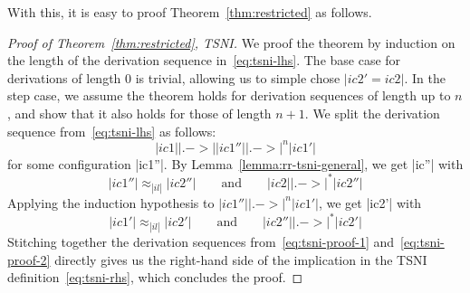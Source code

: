 With this, it is easy to proof Theorem~\ref{thm:restricted} as follows.
\begin{proof}[Proof of Theorem~\ref{thm:restricted}, TSNI]
  We proof the theorem by induction on the length of the derivation sequence in~\eqref{eq:tsni-lhs}.
  The base case for derivations
  of length 0 is trivial, allowing
  us to simple chose $|ic2'=ic2|$.  In the step case, we assume
  the theorem holds for derivation sequences of length up to $n$, and show that it also
  holds for those of length $n+1$.  We split the derivation sequence from~\eqref{eq:tsni-lhs} as follows:
  \[
  |ic1| |.->| |ic1''| |.->|^n |ic1'|
  \]
  for some configuration |ic1''|.  By Lemma~\ref{lemma:rr-tsni-general}, we get
  |ic''| with
  \begin{equation} \label{eq:tsni-proof-1}
  |ic1''| \approx_{|il|} |ic2''|
  \qquad \text{and} \qquad
  |ic2| |.->|^* |ic2''|
  \end{equation}
  Applying the induction hypothesis to
  $|ic1''| |.->|^n |ic1'|$, we get |ic2'| with
  \begin{equation} \label{eq:tsni-proof-2}
  |ic1'| \approx_{|il|} |ic2'|
  \qquad \text{and} \qquad
  |ic2''| |.->|^* |ic2'|
  \end{equation}
  Stitching together the derivation sequences from~\eqref{eq:tsni-proof-1} and~\eqref{eq:tsni-proof-2} directly gives
  us the right-hand side of the implication in the TSNI
  definition~\eqref{eq:tsni-rhs}, which concludes the proof.
\end{proof}







